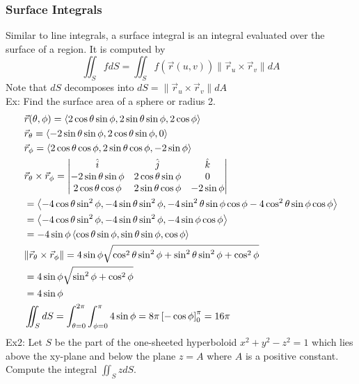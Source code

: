 \documentclass[11pt, fleqn]{article}
\begin{document}
\subsubsection{Surface Integrals}
Similar to line integrals, a surface integral is an integral evaluated over the surface of a region. It is computed by
$$\iint_S fdS=\iint_S f(\vec{r}(u,v))\|\vec{r}_u\times\vec{r}_v\|dA$$
Note that $dS$ decomposes into $dS=\|\vec{r}_u\times\vec{r}_v\|dA$\\
Ex: Find the surface area of a sphere or radius 2.
\begin{align*}
    &\vec{r}(\theta,\phi)=\left\langle 2\cos\theta\sin\phi,2\sin\theta\sin\phi,2\cos\phi \right\rangle\\
    &\vec{r}_\theta=\left\langle -2\sin\theta\sin\phi,2\cos\theta\sin\phi,0 \right\rangle\\
    &\vec{r}_\phi=\left\langle 2\cos\theta\cos\phi,2\sin\theta\cos\phi,-2\sin\phi \right\rangle\\
    &\vec{r}_\theta\times\vec{r}_\phi=\left|\begin{matrix} \hat{i}&\hat{j}&\hat{k}\\-2\sin\theta\sin\phi&2\cos\theta\sin\phi&0\\2\cos\theta\cos\phi&2\sin\theta\cos\phi&-2\sin\phi \end{matrix}\right|\\
    &=\left\langle -4\cos\theta\sin^2\phi,-4\sin\theta\sin^2\phi,-4\sin^2\theta\sin\phi\cos\phi-4\cos^2\theta\sin\phi\cos\phi \right\rangle\\
    &=\left\langle -4\cos\theta\sin^2\phi,-4\sin\theta\sin^2\phi,-4\sin\phi\cos\phi \right\rangle\\
    &=-4\sin\phi\left\langle \cos\theta\sin\phi,\sin\theta\sin\phi,\cos\phi \right\rangle\\
    &\|\vec{r}_\theta\times\vec{r}_\phi\|=4\sin\phi\sqrt{\cos^2\theta\sin^2\phi+\sin^2\theta\sin^2\phi+\cos^2\phi}\\
    &=4\sin\phi\sqrt{\sin^2\phi+\cos^2\phi}\\
    &=4\sin\phi\\
    &\iint_S dS=\int_{\theta=0}^{2\pi}\int_{\phi=0}^{\pi}4\sin\phi=8\pi\left[ -\cos\phi \right]_0^{\pi}=16\pi
\end{align*}
Ex2: Let $S$ be the part of the one-sheeted hyperboloid $x^2+y^2-z^2=1$ which lies above the xy-plane and below the plane $z=A$ where $A$ is a positive constant. Compute the integral $\iint_S zdS$.
\end{document}
